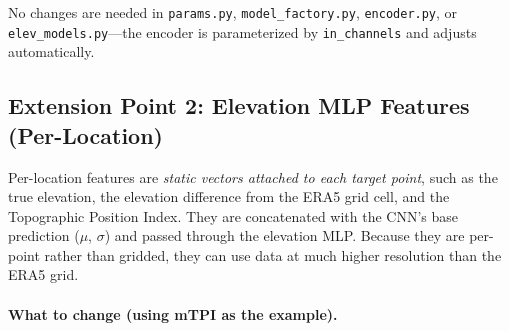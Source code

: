 No changes are needed in \texttt{params.py}, \texttt{model\_factory.py}, \texttt{encoder.py}, or \texttt{elev\_models.py}---the encoder is parameterized by \texttt{in\_channels} and adjusts automatically.

\subsection{Extension Point 2: Elevation MLP Features (Per-Location)}

Per-location features are \emph{static vectors attached to each target point}, such as the true elevation, the elevation difference from the ERA5 grid cell, and the Topographic Position Index.
They are concatenated with the CNN's base prediction ($\mu$, $\sigma$) and passed through the elevation MLP.
Because they are per-point rather than gridded, they can use data at much higher resolution than the ERA5 grid.

\paragraph{What to change (using mTPI as the example).}

